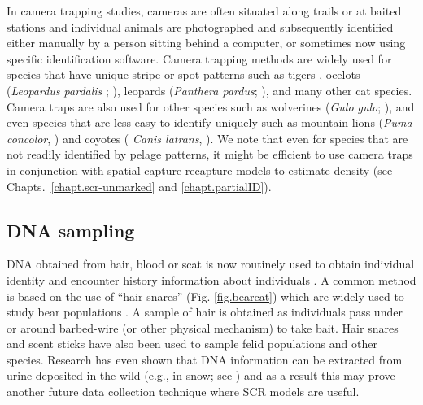 In camera trapping studies, cameras are often situated along trails or at
baited stations and individual animals are photographed and
subsequently identified either manually by a person sitting behind a
computer, or sometimes now using specific identification
software. Camera trapping methods are widely used for species that
have unique stripe or spot patterns such as tigers
\citep{karanth:1995, karanth_nichols:1998}, ocelots ({\it Leopardus
  pardalis }; \citep{trolle_kery:2003,trolle_kery:2005}), leopards
({\it Panthera pardus}; \citep{balme_etal:2010}), and many other cat
species.  Camera traps are also used for other species such as
wolverines ({\it Gulo gulo};
\citep{magoun_etal:2011,royle_etal:2011jwm}), and even species that
are less easy to identify uniquely such as mountain lions ({\it Puma
  concolor}, \citep{sollmann_etal:inprepjapplecol}) and coyotes ({\it
  Canis latrans}, \citep{kelly_etal:2008}).  We note that even for
species that are not readily identified by pelage patterns, it might
be efficient to use camera traps in conjunction with spatial
capture-recapture models to estimate density (see
Chapts.~\ref{chapt.scr-unmarked} and \ref{chapt.partialID}).








\subsection{DNA sampling}

DNA obtained from hair, blood or scat is now routinely used to obtain
individual identity and encounter history information about
individuals \citep{taberlet_bouvent:1992, kohn_etal:1999,
  woods_etal:1999, mills_etal:2000, schwartz_monfort:2008}.  A common
method is based on the use of ``hair snares'' (Fig. \ref{fig.bearcat})
which are widely used to study bear populations
\citep{woods_etal:1999, garshelis_etal:2006,
  kendall_etal:2009,gardner_etal:2010jwm}.  A sample of hair is
obtained as individuals pass under or around barbed-wire (or other
physical mechanism) to take bait. Hair snares and scent sticks have
also been used to sample felid populations
\citep{garciaalaniz_etal:2010, kery_etal:2010} and other
species. Research has even shown that DNA information can be extracted
from urine deposited in the wild (e.g., in snow; see
\cite{valiere_taberlet:2000}) and as a result this may prove another
future data collection technique where SCR models are useful.

